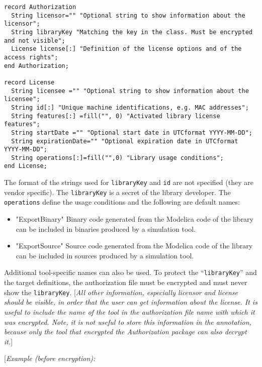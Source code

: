 \begin{lstlisting}[language=modelica]
record Authorization
  String licensor="" "Optional string to show information about the licensor";
  String libraryKey "Matching the key in the class. Must be encrypted and not visible";
  License license[:] "Definition of the license options and of the access rights";
end Authorization;

record License
  String licensee ="" "Optional string to show information about the licensee";
  String id[:] "Unique machine identifications, e.g. MAC addresses";
  String features[:] =fill("", 0) "Activated library license features";
  String startDate ="" "Optional start date in UTCformat YYYY-MM-DD";
  String expirationDate="" "Optional expiration date in UTCformat YYYY-MM-DD";
  String operations[:]=fill("",0) "Library usage conditions";
end License;
\end{lstlisting}
The format of the strings used for \lstinline!libraryKey! and \lstinline!id! are not specified
(they are vendor specific). The \lstinline!libraryKey! is a secret of the library
developer. The \lstinline!operations! define the usage conditions and the following
are default names:

\begin{itemize}
\item
  "ExportBinary" Binary code generated from the Modelica code of the
  library can be included in binaries produced by a simulation
  tool.
\item
  "ExportSource" Source code generated from the Modelica code of the
  library can be included in sources produced by a simulation tool.
\end{itemize}

Additional tool-specific names can also be used. To protect the
``\lstinline!libraryKey!'' and the target definitions, the authorization file must
be encrypted and must never show the \lstinline!libraryKey!. {[}\emph{All other
information, especially licensor and license should be visible, in order
that the user can get information about the license. It is useful to
include the name of the tool in the authorization file name with which
it was encrypted. Note, it is not useful to store this information in
the annotation, because only the tool that encrypted the Authorization
package can also decrypt it.}{]}

{[}\emph{Example (before encryption):}

